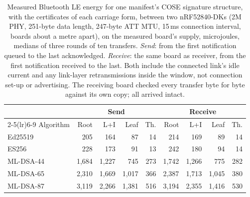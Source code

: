 \begin{table}[t]
\caption{Measured Bluetooth LE energy for one manifest's COSE signature structure, with the certificates of each carriage form, between two nRF52840-DKs (2M PHY, 251-byte data length, 247-byte ATT MTU, 15\,ms connection interval, boards about a metre apart), on the measured board's supply, microjoules, medians of three rounds of ten transfers. \emph{Send}: from the first notification queued to the last acknowledged. \emph{Receive}: the same board as receiver, from the first notification received to the last. Both include the connected link's idle current and any link-layer retransmissions inside the window, not connection set-up or advertising. The receiving board checked every transfer byte for byte against its own copy; all arrived intact.}
\label{tab:radio}
\small
\setlength{\tabcolsep}{4pt}
\begin{tabular}{lrrrrrrrr}
\toprule
 & \multicolumn{4}{c}{Send} & \multicolumn{4}{c}{Receive}\\
\cmidrule(lr){2-5}\cmidrule(lr){6-9}
Algorithm & Root & L+I & Leaf & Th. & Root & L+I & Leaf & Th.\\
\midrule
Ed25519 & 205 & 164 & 87 & 14 & 214 & 169 & 89 & 14\\
ES256 & 228 & 173 & 91 & 13 & 242 & 180 & 94 & 14\\
ML-DSA-44 & 1,684 & 1,227 & 745 & 273 & 1,742 & 1,266 & 775 & 282\\
ML-DSA-65 & 2,310 & 1,669 & 1,017 & 366 & 2,387 & 1,713 & 1,045 & 380\\
ML-DSA-87 & 3,119 & 2,266 & 1,381 & 516 & 3,194 & 2,355 & 1,416 & 530\\
\bottomrule
\end{tabular}
\end{table}
